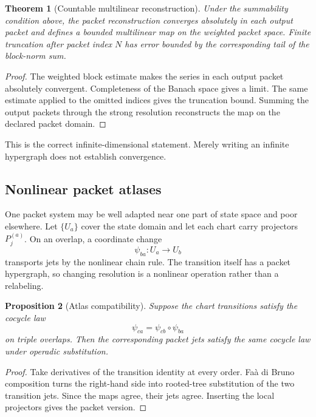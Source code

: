 \documentclass[11pt]{article}
\newtheorem{theorem}{Theorem}[section]
\newtheorem{proposition}[theorem]{Proposition}
\theoremstyle{definition}
\theoremstyle{remark}
\begin{document}
\begin{theorem}[Countable multilinear reconstruction]
Under the summability condition above, the packet reconstruction converges absolutely in each output packet and defines a bounded multilinear map on the weighted packet space.  Finite truncation after packet index $N$ has error bounded by the corresponding tail of the block-norm sum.
\end{theorem}

\begin{proof}
The weighted block estimate makes the series in each output packet absolutely convergent.  Completeness of the Banach space gives a limit.  The same estimate applied to the omitted indices gives the truncation bound.  Summing the output packets through the strong resolution reconstructs the map on the declared packet domain.
\end{proof}

This is the correct infinite-dimensional statement.  Merely writing an infinite hypergraph does not establish convergence.

\subsection{Nonlinear packet atlases}

One packet system may be well adapted near one part of state space and poor elsewhere.  Let $\{U_a\}$ cover the state domain and let each chart carry projectors $P_j^{(a)}$.  On an overlap, a coordinate change
\[
\psi_{ba}:U_a\to U_b
\]
transports jets by the nonlinear chain rule.  The transition itself has a packet hypergraph, so changing resolution is a nonlinear operation rather than a relabeling.

\begin{proposition}[Atlas compatibility]
Suppose the chart transitions satisfy the cocycle law
\[
\psi_{ca}=\psi_{cb}\circ\psi_{ba}
\]
on triple overlaps.  Then the corresponding packet jets satisfy the same cocycle law under operadic substitution.
\end{proposition}

\begin{proof}
Take derivatives of the transition identity at every order.  Fa\`a di Bruno composition turns the right-hand side into rooted-tree substitution of the two transition jets.  Since the maps agree, their jets agree.  Inserting the local projectors gives the packet version.
\end{proof}
\end{document}
